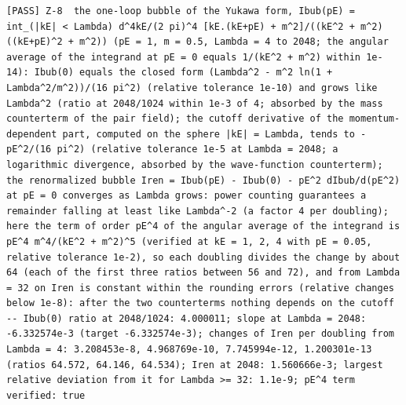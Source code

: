\documentclass[
  10pt,
]{article}
\begin{document}
\begin{verbatim}
[PASS] Z-8  the one-loop bubble of the Yukawa form, Ibub(pE) = int_(|kE| < Lambda) d^4kE/(2 pi)^4 [kE.(kE+pE) + m^2]/((kE^2 + m^2)((kE+pE)^2 + m^2)) (pE = 1, m = 0.5, Lambda = 4 to 2048; the angular average of the integrand at pE = 0 equals 1/(kE^2 + m^2) within 1e-14): Ibub(0) equals the closed form (Lambda^2 - m^2 ln(1 + Lambda^2/m^2))/(16 pi^2) (relative tolerance 1e-10) and grows like Lambda^2 (ratio at 2048/1024 within 1e-3 of 4; absorbed by the mass counterterm of the pair field); the cutoff derivative of the momentum-dependent part, computed on the sphere |kE| = Lambda, tends to -pE^2/(16 pi^2) (relative tolerance 1e-5 at Lambda = 2048; a logarithmic divergence, absorbed by the wave-function counterterm); the renormalized bubble Iren = Ibub(pE) - Ibub(0) - pE^2 dIbub/d(pE^2) at pE = 0 converges as Lambda grows: power counting guarantees a remainder falling at least like Lambda^-2 (a factor 4 per doubling); here the term of order pE^4 of the angular average of the integrand is pE^4 m^4/(kE^2 + m^2)^5 (verified at kE = 1, 2, 4 with pE = 0.05, relative tolerance 1e-2), so each doubling divides the change by about 64 (each of the first three ratios between 56 and 72), and from Lambda = 32 on Iren is constant within the rounding errors (relative changes below 1e-8): after the two counterterms nothing depends on the cutoff  -- Ibub(0) ratio at 2048/1024: 4.000011; slope at Lambda = 2048: -6.332574e-3 (target -6.332574e-3); changes of Iren per doubling from Lambda = 4: 3.208453e-8, 4.968769e-10, 7.745994e-12, 1.200301e-13 (ratios 64.572, 64.146, 64.534); Iren at 2048: 1.560666e-3; largest relative deviation from it for Lambda >= 32: 1.1e-9; pE^4 term verified: true
\end{verbatim}
\end{document}
